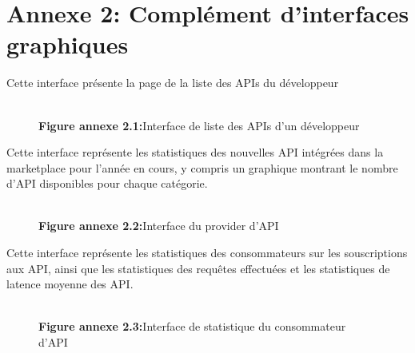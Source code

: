 




\newpage
\section{Annexe 2: Complément d'interfaces graphiques}

Cette interface présente la page de la liste des APIs du développeur 
\begin{figure}[H]
    \centering
    {\\\textbf{Figure annexe 2.1:}Interface de liste des APIs d'un développeur }
    \label{fig:logo_tt}
\end{figure}


Cette interface représente les statistiques des nouvelles API intégrées dans la marketplace pour l'année en cours, y compris un graphique montrant le nombre d'API disponibles pour chaque catégorie.
\begin{figure}[H]
    \centering
    {\\\textbf{Figure annexe 2.2:}Interface du provider d'API }
    \label{fig:logo_tt}
\end{figure}


Cette interface représente les statistiques des consommateurs sur les souscriptions aux API, ainsi que les statistiques des requêtes effectuées et les statistiques de latence moyenne des API.
\begin{figure}[H]
    \centering
    {\\\textbf{Figure annexe 2.3:}Interface de statistique du consommateur d'API }
    \label{fig:logo_tt}
\end{figure}

